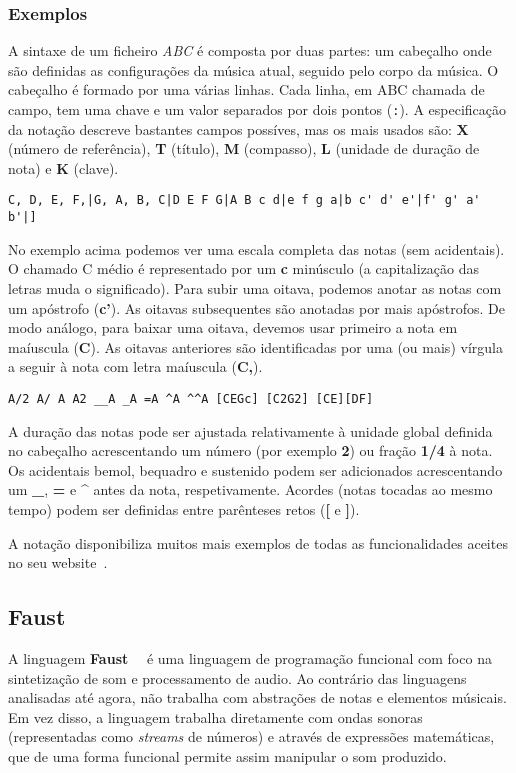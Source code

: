     \subsubsection{Exemplos}
A sintaxe de um ficheiro \textit{ABC} é composta por duas partes: um cabeçalho onde são definidas as configurações da música atual, seguido pelo corpo da música. O cabeçalho é formado por uma várias linhas. Cada linha, em ABC chamada de campo, tem uma chave e um valor separados por dois pontos (\texttt{:}). A especificação da notação descreve bastantes campos possíves, mas os mais usados são: \textbf{X} (número de referência), \textbf{T} (título), \textbf{M} (compasso), \textbf{L} (unidade de duração de nota) e \textbf{K} (clave).

\begin{lstlisting}[caption={Exemplo da notação ABC}]
C, D, E, F,|G, A, B, C|D E F G|A B c d|e f g a|b c' d' e'|f' g' a' b'|]
\end{lstlisting}

No exemplo acima podemos ver uma escala completa das notas (sem acidentais). O chamado C médio é representado por um \textbf{c} minúsculo (a capitalização das letras muda o significado). Para subir uma oitava, podemos anotar as notas com um apóstrofo (\textbf{c'}). As oitavas subsequentes são anotadas por mais apóstrofos. De modo análogo, para baixar uma oitava, devemos usar primeiro a nota em maíuscula (\textbf{C}). As oitavas anteriores são identificadas por uma (ou mais) vírgula a seguir à nota com letra maíuscula (\textbf{C,}).


\begin{lstlisting}[caption={Exemplo da notação ABC}]
A/2 A/ A A2 __A _A =A ^A ^^A [CEGc] [C2G2] [CE][DF]
\end{lstlisting}
A duração das notas pode ser ajustada relativamente à unidade global definida no cabeçalho acrescentando um número (por exemplo \textbf{2}) ou fração \textbf{1/4} à nota. Os acidentais bemol, bequadro e sustenido podem ser adicionados acrescentando um \textbf{\_}, \textbf{=} e \textbf{\^} antes da nota, respetivamente. Acordes (notas tocadas ao mesmo tempo) podem ser definidas entre parênteses retos (\textbf{[} e \textbf{]}).

A notação disponibiliza muitos mais exemplos de todas as funcionalidades aceites no seu website~\cite{abc-notation-examples}.

\subsection{Faust}
A linguagem \textbf{Faust}~\cite{orlarey:Faust}~\cite{faust} é uma linguagem de programação funcional com foco na sintetização de som e processamento de audio. Ao contrário das linguagens analisadas até agora, não trabalha com abstrações de notas e elementos músicais. Em vez disso, a linguagem trabalha diretamente com ondas sonoras (representadas como \textit{streams} de números) e através de expressões matemáticas, que de uma forma funcional permite assim manipular o som produzido.

